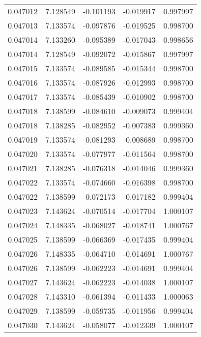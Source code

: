 \begin{tabular}{lrrrr}
0.047012    &  7.128549 & -0.101193 & -0.019917 &             0.997997 \\
0.047013    &  7.133574 & -0.097876 & -0.019525 &             0.998700 \\
0.047014    &  7.133260 & -0.095389 & -0.017043 &             0.998656 \\
0.047014    &  7.128549 & -0.092072 & -0.015867 &             0.997997 \\
0.047015    &  7.133574 & -0.089585 & -0.015344 &             0.998700 \\
0.047016    &  7.133574 & -0.087926 & -0.012993 &             0.998700 \\
0.047017    &  7.133574 & -0.085439 & -0.010902 &             0.998700 \\
0.047018    &  7.138599 & -0.084610 & -0.009073 &             0.999404 \\
0.047018    &  7.138285 & -0.082952 & -0.007383 &             0.999360 \\
0.047019    &  7.133574 & -0.081293 & -0.008689 &             0.998700 \\
0.047020    &  7.133574 & -0.077977 & -0.011564 &             0.998700 \\
0.047021    &  7.138285 & -0.076318 & -0.014046 &             0.999360 \\
0.047022    &  7.133574 & -0.074660 & -0.016398 &             0.998700 \\
0.047022    &  7.138599 & -0.072173 & -0.017182 &             0.999404 \\
0.047023    &  7.143624 & -0.070514 & -0.017704 &             1.000107 \\
0.047024    &  7.148335 & -0.068027 & -0.018741 &             1.000767 \\
0.047025    &  7.138599 & -0.066369 & -0.017435 &             0.999404 \\
0.047026    &  7.148335 & -0.064710 & -0.014691 &             1.000767 \\
0.047026    &  7.138599 & -0.062223 & -0.014691 &             0.999404 \\
0.047027    &  7.143624 & -0.062223 & -0.014038 &             1.000107 \\
0.047028    &  7.143310 & -0.061394 & -0.011433 &             1.000063 \\
0.047029    &  7.138599 & -0.059735 & -0.011956 &             0.999404 \\
0.047030    &  7.143624 & -0.058077 & -0.012339 &             1.000107 \\

\end{tabular}
